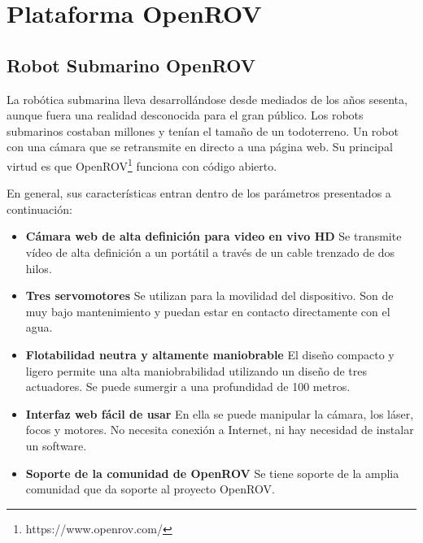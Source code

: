 \chapter{Plataforma OpenROV}
\label{cap:plataformaOpenROV}

\section{Robot Submarino OpenROV}
\label{cap:Robot Submarino OpenROV}
La robótica submarina lleva desarrollándose desde mediados de los años sesenta, aunque fuera una realidad desconocida para el gran público. Los robots submarinos costaban millones y tenían el tamaño de un todoterreno. Un robot con una cámara que se retransmite en directo a una página web. Su principal virtud es que OpenROV\footnote{https://www.openrov.com/} funciona con código abierto.

En general, sus características entran dentro de los parámetros presentados a continuación:

  \begin{itemize}
  \item \textbf{Cámara web de alta definición para video en vivo HD} Se transmite vídeo de alta definición a un portátil a través de un cable trenzado de dos hilos.
  \item \textbf{Tres servomotores} Se utilizan para la movilidad del dispositivo. Son de muy bajo mantenimiento y puedan estar en contacto directamente con el agua.
  \item \textbf{Flotabilidad neutra y altamente maniobrable} El diseño compacto y ligero permite una alta maniobrabilidad utilizando un diseño de tres actuadores. Se puede sumergir a una profundidad de 100 metros.
  \item \textbf{Interfaz web fácil de usar} En ella se puede manipular la cámara, los láser, focos y motores. No necesita conexión a Internet, ni hay necesidad de instalar un software.
  \item \textbf{Soporte de la comunidad de OpenROV} Se tiene soporte de la amplia comunidad que da soporte al proyecto OpenROV.
  \end{itemize}

